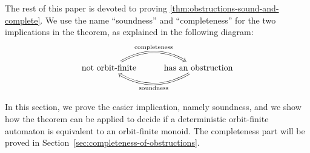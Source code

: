 The rest of this paper is devoted to proving \cref{thm:obstructions-sound-and-complete}.
We use the name ``soundness'' and ``completeness'' for the two implications in  the theorem, as explained in the following diagram: 
\[
\begin{tikzcd}
\text{not orbit-finite}
\arrow[r, bend left, Rightarrow, "\text{completeness}"]
& 
\text{has an obstruction}
\arrow[l, bend left, Rightarrow, "\text{soundness}"]
\end{tikzcd}
\]


In this section, we prove the easier implication, namely soundness, and we show how the theorem can be applied to decide if a deterministic orbit-finite automaton is equivalent to an orbit-finite monoid.  The completeness part will be proved in Section~\ref{sec:completeness-of-obstructions}.

